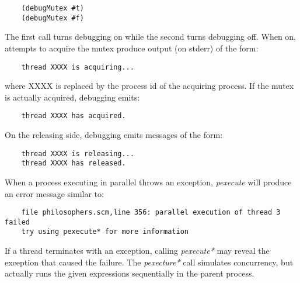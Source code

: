 \begin{verbatim}
    (debugMutex #t)
    (debugMutex #f)
\end{verbatim}

The first call turns debugging on while the second turns debugging off. When
on, attempts to acquire the mutex produce output (on stderr) of
the form:

\begin{verbatim}
    thread XXXX is acquiring...
\end{verbatim}

where XXXX is replaced by the process id of the acquiring process.
If the mutex is actually acquired, debugging emits:

\begin{verbatim}
    thread XXXX has acquired.
\end{verbatim}

On the releasing side, debugging emits messages of the form:

\begin{verbatim}
    thread XXXX is releasing...
    thread XXXX has released.
\end{verbatim}

When a process executing in parallel throws an exception, {\it pexecute} will
produce an error message similar to:

\begin{verbatim}
    file philosophers.scm,line 356: parallel execution of thread 3 failed
    try using pexecute* for more information
\end{verbatim}

If a thread terminates with an exception,
calling {\it pexecute*} may reveal the
exception that caused the failure.
The {\it pexecture*} call simulates concurrency, but actually runs the
given expressions sequentially in the parent process.
